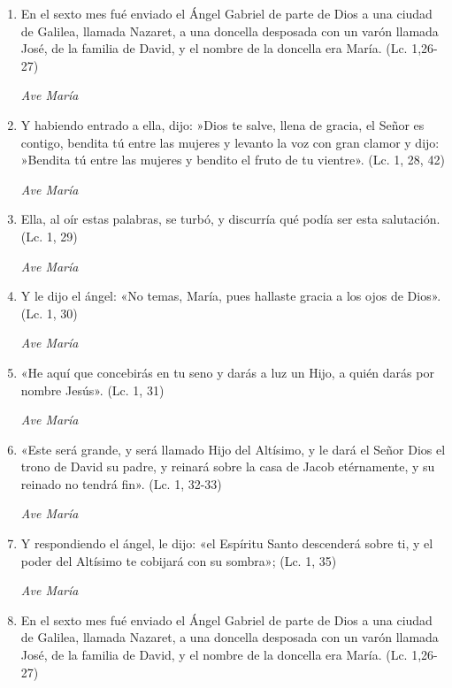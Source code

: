 \documentclass[a4paper,11pt, oneside]{report}
\begin{document}
        \begin{enumerate}
          \item En el sexto mes fué enviado el Ángel Gabriel de parte de Dios a una ciudad de Galilea, llamada Nazaret, a una 
          doncella desposada con un varón llamada José, de la familia de David, y el nombre de la doncella era María. (Lc. 1,26- 27)

          \textit{Ave María}

          \item Y habiendo entrado a ella, dijo: »Dios te salve, llena de gracia, el Señor es contigo, bendita tú entre las mujeres 
          y levanto la voz con gran clamor y dijo: »Bendita tú entre las mujeres y bendito el fruto de tu vientre». (Lc. 1, 28, 42)

          \textit{Ave María}

          \item Ella, al oír estas palabras, se turbó, y discurría qué podía ser esta salutación. (Lc. 1, 29)

          \textit{Ave María}

          \item Y le dijo el ángel: «No temas, María, pues hallaste gracia a los ojos de Dios». (Lc. 1, 30)

          \textit{Ave María}

          \item «He aquí que concebirás en tu seno y darás a luz un Hijo, a quién darás por nombre Jesús». (Lc. 1, 31)

          \textit{Ave María}

          \item «Este será grande, y será llamado Hijo del Altísimo, y le dará el Señor Dios el trono de David su padre, 
          y reinará sobre la casa de Jacob etérnamente, y su reinado no tendrá fin». (Lc. 1, 32-33)

          \textit{Ave María}

          \item Y respondiendo el ángel, le dijo: «el Espíritu Santo descenderá sobre ti, 
          y el poder del Altísimo te cobijará con su sombra»; (Lc. 1, 35)
          
          \textit{Ave María}

          \item En el sexto mes fué enviado el Ángel Gabriel de parte de Dios a una ciudad de Galilea, llamada Nazaret, a una 
          doncella desposada con un varón llamada José, de la familia de David, y el nombre de la doncella era María. (Lc. 1,26- 27)


\end{enumerate}
\end{document}
